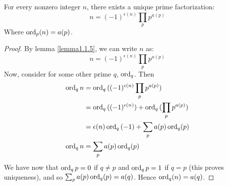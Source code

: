 \begin{theorem}\label{theorem1.1.8}
    For every nonzero integer $n$, there exists a unique prime factorization:
        \begin{equation}\label{equation1.1}
            n=(-1)^{\epsilon(n)} \prod_{p} p^{a(p)}
        \end{equation}
    Where $\operatorname{ord}_p(n)=a(p)$. 
\end{theorem}
\begin{proof}
    By lemma \ref{lemma1.1.5}, we can write $n$ as:
        \begin{equation*}
            n=(-1)^{\epsilon(n)} \prod_{p} p^{a(p)}
        \end{equation*}
    Now, consider for some other prime $q$, $\operatorname{ord}_q$. Then
        \begin{align*}
            \operatorname{ord}_q{n} &= \operatorname{ord}_q{((-1)^{\epsilon(n)} \prod_{p} p^{a(p)})} \\
                     &= \operatorname{ord}_q{((-1)^{\epsilon(n)})}+\operatorname{ord}_q{(\prod_{p} p^{a(p)})} \\
                     &= \epsilon(n)\operatorname{ord}_q{(-1)}+\sum_{p} a(p)\operatorname{ord}_q(p) \\
           \operatorname{ord}_q{n} &= \sum_{p} a(p)\operatorname{ord}_q(p) \\
        \end{align*}
    We have now that $\operatorname{ord}_q{p}=0$ if $q \neq p$ and $\operatorname{ord}_q{p}=1$ if $q=p$ (this proves uniqueness), and so $\sum_{p} a(p)\operatorname{ord}_q(p)=a(q)$. Hence $\operatorname{ord}_q(n)=a(q)$. 
\end{proof}
